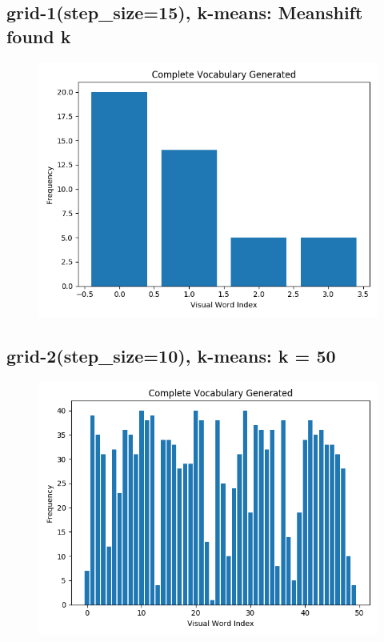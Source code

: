 
\subsection*{grid-1(step\_size=15), k-means: Meanshift found k}
\begin{figure}[H]
    \centering
    \includegraphics[scale = 0.5]{images/bow-stp-15-kmeanshift.png}
\end{figure}

\subsection*{grid-2(step\_size=10), k-means: k = 50}
\begin{figure}[H]
    \centering
    \includegraphics[scale = 0.5]{images/bow-stp-10-50.png}
\end{figure}

